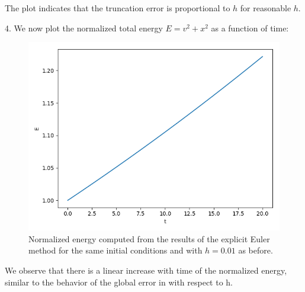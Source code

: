 \documentclass[11pt]{article}
\begin{document}
The plot indicates that the truncation error is proportional to $h$ for reasonable $h$.
\newpage

4. We now plot the normalized total energy $E=v^2 + x^2$ as a function of time:
\begin{figure}[htp]
\centering
\includegraphics[scale=0.7]{energy_1_0_0-01_20.png}
\caption{Normalized energy computed from the results of the explicit Euler method for the same initial conditions and with $h=0.01$ as before.}
\label{eulerenergy}
\end{figure}

We observe that there is a linear increase with time of the normalized energy, similar to the behavior of the global error in with respect to h.
\end{document}
